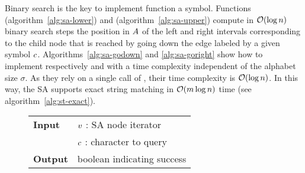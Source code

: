 Binary search is the key to implement function  a symbol.
Functions  (algorithm~\ref{alg:sa-lower}) and  (algorithm~\ref{alg:sa-upper}) compute in $\mathcal{O}(\log{n})$ binary search steps the position in $A$ of the left and right intervals corresponding to the child node that is reached by going down the edge labeled by a given symbol $c$.
Algorithms~\ref{alg:sa-godown} and \ref{alg:sa-goright} show how to implement respectively  and  with a time complexity independent of the alphabet size $\sigma$.
As they rely on a single call of , their time complexity is $\mathcal{O}(\log{n})$.
In this way, the SA supports exact string matching in $\mathcal{O}(m \log{n})$ time (see algorithm~\ref{alg:st-exact}).

\begin{figure*}[b!]
\begin{center}
\begin{minipage}[t]{.6\textwidth}
\begin{algorithm}[H]
\begin{tabular}{ll}
\textbf{Input}  & $v$ : SA node iterator\\
				& $c$ : character to query\\
\textbf{Output} & boolean indicating success\\
\end{tabular}
\begin{algorithmic}[1]
	\State \Return \False
\EndIf
{}
	\State \Return \True
\Else
	\State \Return \False
\EndIf
\end{algorithmic}
\label{alg:sa-godownc}
\end{algorithm}
\end{minipage}
\end{center}
\end{figure*}

